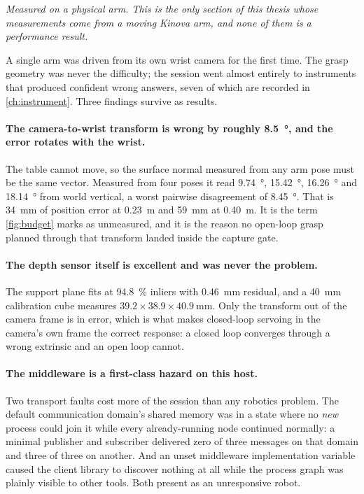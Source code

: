 \emph{Measured on a physical arm. This is the only section of this thesis
whose measurements come from a moving Kinova arm, and none of them is a
performance result.}

A single arm was driven from its own wrist camera for the first time. The
grasp geometry was never the difficulty; the session went almost entirely to
instruments that produced confident wrong answers, seven of which are recorded
in \cref{ch:instrument}. Three findings survive as results.

\paragraph{The camera-to-wrist transform is wrong by roughly
\SI{8.5}{\degree}, and the error rotates with the wrist.} The table cannot
move, so the surface normal measured from any arm pose must be the same
vector. Measured from four poses it read \SI{9.74}{\degree},
\SI{15.42}{\degree}, \SI{16.26}{\degree} and \SI{18.14}{\degree} from world
vertical, a worst pairwise disagreement of \SI{8.45}{\degree}. That is
\SI{34}{\milli\metre} of position error at \SI{0.23}{\metre} and
\SI{59}{\milli\metre} at \SI{0.40}{\metre}. It is the term
\cref{fig:budget} marks as unmeasured, and it is the reason no open-loop
grasp planned through that transform landed inside the capture gate.

\paragraph{The depth sensor itself is excellent and was never the problem.}
The support plane fits at \SI{94.8}{\percent} inliers with
\SI{0.46}{\milli\metre} residual, and a \SI{40}{\milli\metre} calibration cube
measures $39.2 \times 38.9 \times \SI{40.9}{\milli\metre}$. Only the transform
out of the camera frame is in error, which is what makes closed-loop servoing
in the camera's own frame the correct response: a closed loop converges
through a wrong extrinsic and an open loop cannot.

\paragraph{The middleware is a first-class hazard on this host.} Two transport
faults cost more of the session than any robotics problem. The default
communication domain's shared memory was in a state where no \emph{new}
process could join it while every already-running node continued normally: a
minimal publisher and subscriber delivered zero of three messages on that
domain and three of three on another. And an unset middleware implementation
variable caused the client library to discover nothing at all while the
process graph was plainly visible to other tools. Both present as an
unresponsive robot.

